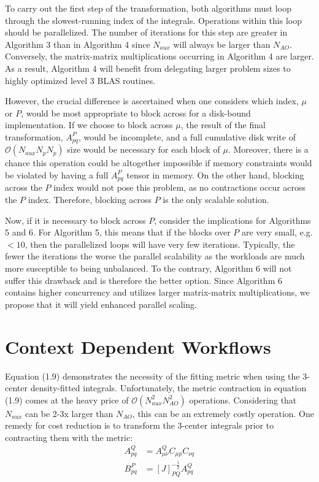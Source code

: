 To carry out the first step of the transformation, both algorithms must loop through the slowest-running index of the integrals.
Operations within this loop should be parallelized.
The number of iterations for this step are greater in Algorithm 3 than in Algorithm 4 since $N_{aux}$ will always be 
larger than $N_{AO}$.
Conversely, the matrix-matrix multiplications occurring in Algorithm 4 are larger. As a result, Algorithm 4 will benefit from delegating
larger problem sizes to highly optimized level 3 BLAS routines. 

However, the crucial difference is ascertained when one considers which index, $\mu$ or $P$, would be most appropriate to block across
for a disk-bound implementation. If we choose to block across $\mu$, the result of the final transformation, $A_{pq}^P$, would be incomplete,
and a full cumulative disk write of $\mathcal{O}(N_{aux}N_pN_p)$ size would be necessary for each block of $\mu$. Moreover, there is a chance
this operation could be altogether impossible if memory constraints would be violated by having a full $A_{pq}^P$ tensor in memory. 
On the other hand, 
blocking across the $P$ index would not pose this problem, as no contractions occur across the $P$ index. Therefore, blocking across 
$P$ is the only scalable solution.

Now, if it is necessary to block across $P$, consider the implications for Algorithms 5 and 6. For Algorithm 5, this means that if the blocks
over $P$ are very small, e.g. $<10$, then the parallelized loops will have very few iterations. Typically, the fewer the iterations the worse
the parallel scalability as the workloads are much more susceptible to being unbalanced. To the contrary, Algorithm 6 will not suffer this 
drawback and is therefore the better option. Since Algorithm 6 contains higher concurrency and utilizes larger matrix-matrix multiplications, 
we propose that it will yield enhanced parallel scaling. 

\section{Context Dependent Workflows}

Equation (1.9) demonstrates the necessity of the fitting metric when using the 3-center density-fitted integrals. Unfortunately, the
metric contraction in equation (1.9) comes at the heavy price of $\mathcal{O}(N_{aux}^2N_{AO}^2)$ operations.
Considering that $N_{aux}$ can be 2-3x larger
than $N_{AO}$, this can be an extremely costly operation. One remedy for cost reduction is to transform the 3-center integrals prior to contracting
them with the metric:
\begin{align} 
A_{p q}^Q &= A_{\mu \nu}^Q C_{\mu p}C_{\nu q} \\
B_{pq}^P &= [J]_{PQ}^{-\frac{1}{2}}A_{p q}^Q
\end{align}
 
